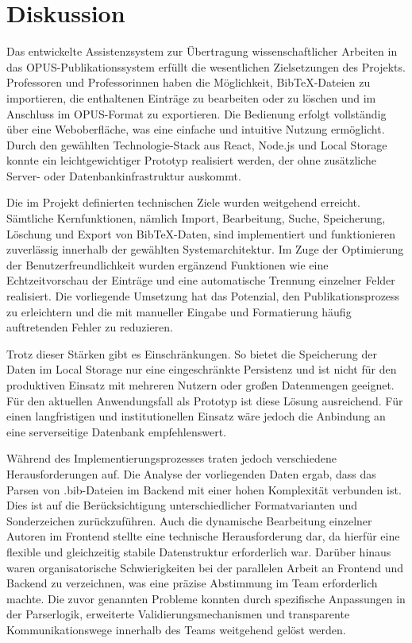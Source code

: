 \chapter{Diskussion}

Das entwickelte Assistenzsystem zur Übertragung wissenschaftlicher Arbeiten in das OPUS-Publikationssystem erfüllt die wesentlichen 
Zielsetzungen des Projekts. Professoren und Professorinnen haben die Möglichkeit, BibTeX-Dateien zu importieren, die enthaltenen 
Einträge zu bearbeiten oder zu löschen und im Anschluss im OPUS-Format zu exportieren. Die Bedienung erfolgt vollständig über 
eine Weboberfläche, was eine einfache und intuitive Nutzung ermöglicht. Durch den gewählten Technologie-Stack aus React, Node.js 
und Local Storage konnte ein leichtgewichtiger Prototyp realisiert werden, der ohne zusätzliche Server- oder Datenbankinfrastruktur 
auskommt.

Die im Projekt definierten technischen Ziele wurden weitgehend erreicht. Sämtliche Kernfunktionen, nämlich Import, Bearbeitung, 
Suche, Speicherung, Löschung und Export von BibTeX-Daten, sind implementiert und funktionieren zuverlässig innerhalb der gewählten 
Systemarchitektur. Im Zuge der Optimierung der Benutzerfreundlichkeit wurden ergänzend Funktionen wie eine Echtzeitvorschau der 
Einträge und eine automatische Trennung einzelner Felder realisiert. Die vorliegende Umsetzung hat das Potenzial, den 
Publikationsprozess zu erleichtern und die mit manueller Eingabe und Formatierung häufig auftretenden Fehler zu reduzieren.

Trotz dieser Stärken gibt es Einschränkungen. So bietet die Speicherung der Daten im Local Storage nur eine eingeschränkte 
Persistenz und ist nicht für den produktiven Einsatz mit mehreren Nutzern oder großen Datenmengen geeignet. Für den aktuellen 
Anwendungsfall als Prototyp ist diese Lösung ausreichend. Für einen langfristigen und institutionellen Einsatz wäre jedoch 
die Anbindung an eine serverseitige Datenbank empfehlenswert.

Während des Implementierungsprozesses traten jedoch verschiedene Herausforderungen auf. Die Analyse der vorliegenden Daten ergab, 
dass das Parsen von .bib-Dateien im Backend mit einer hohen Komplexität verbunden ist. Dies ist auf die Berücksichtigung 
unterschiedlicher Formatvarianten und Sonderzeichen zurückzuführen. Auch die dynamische Bearbeitung einzelner Autoren im 
Frontend stellte eine technische Herausforderung dar, da hierfür eine flexible und gleichzeitig stabile Datenstruktur 
erforderlich war. Darüber hinaus waren organisatorische Schwierigkeiten bei der parallelen Arbeit an Frontend und 
Backend zu verzeichnen, was eine präzise Abstimmung im Team erforderlich machte. Die zuvor genannten Probleme konnten 
durch spezifische Anpassungen in der Parserlogik, erweiterte Validierungsmechanismen und transparente Kommunikationswege 
innerhalb des Teams weitgehend gelöst werden.

